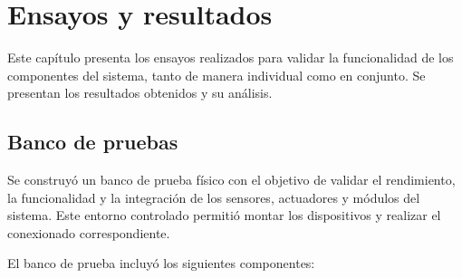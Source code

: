 \chapter{Ensayos y resultados} %

\label{Chapter4}

Este capítulo presenta los ensayos realizados para validar la funcionalidad de
los componentes del sistema, tanto de manera individual como en conjunto. Se
presentan los resultados obtenidos y su análisis.

\section{Banco de pruebas}

Se construyó un banco de prueba físico con el objetivo de validar el
rendimiento, la funcionalidad y la integración de los sensores, actuadores y
módulos del sistema. Este entorno controlado permitió montar los dispositivos y
realizar el conexionado correspondiente.


El banco de prueba incluyó los siguientes componentes:

